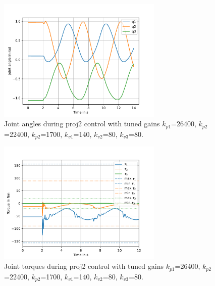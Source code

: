 \begin{figure} [H]
   \begin{center}
        \includegraphics[width=0.7\textwidth]{SRC/CircleTraj_q1q2q3.pdf}
   \end{center}
  \caption{Joint angles during proj2 control with tuned gains $k_{p1}$=26400, $k_{p2}$=22400, $k_{p2}$=1700, $k_{v1}$=140, $k_{v2}$=80, $k_{v3}$=80.}
  \label{fig:CircTunedq123}
\end{figure}


\begin{figure} [H]
   \begin{center}
        \includegraphics[width=0.7\textwidth]{SRC/CircleTraj_tau.pdf}
   \end{center}
  \caption{Joint torques during proj2 control with tuned gains $k_{p1}$=26400, $k_{p2}$=22400, $k_{p2}$=1700, $k_{v1}$=140, $k_{v2}$=80, $k_{v3}$=80.}
  \label{fig:CircTunedtau}
\end{figure}

